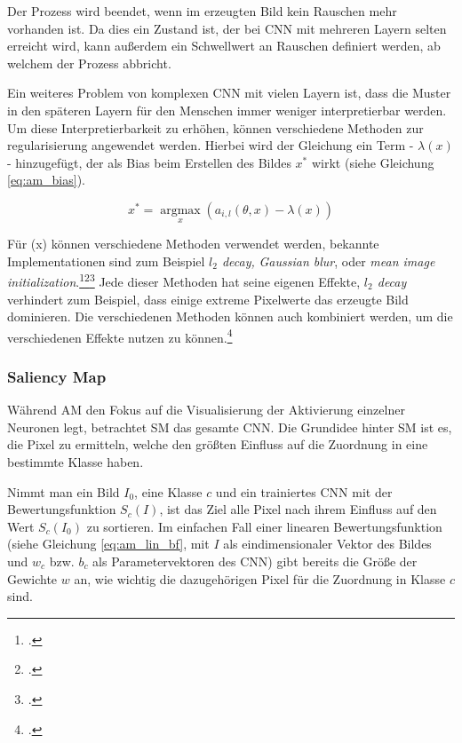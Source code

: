 Der Prozess wird beendet, wenn im erzeugten Bild kein Rauschen mehr vorhanden ist. Da dies ein Zustand ist, der bei \ac{CNN} mit mehreren Layern selten erreicht wird, kann außerdem ein Schwellwert an Rauschen definiert werden, ab welchem der Prozess abbricht.

Ein weiteres Problem von komplexen \ac{CNN} mit vielen Layern ist, dass die Muster in den späteren Layern für den Menschen immer weniger interpretierbar werden. Um diese Interpretierbarkeit zu erhöhen, können verschiedene Methoden zur regularisierung angewendet werden. Hierbei wird der Gleichung ein Term - $\lambda(x)$ -  hinzugefügt, der als Bias beim Erstellen des Bildes $x^*$ wirkt (siehe Gleichung \ref{eq:am_bias}).

\begin{equation} \label{eq:am_bias}
    x^{*}=\underset{x}{\operatorname{argmax}}\left(a_{i, l}(\theta, x)-\lambda(x)\right)
\end{equation}

Für \lambda(x) können verschiedene Methoden verwendet werden, bekannte Implementationen sind zum Beispiel \textit{$l_2$ decay,} \textit{Gaussian blur}, oder \textit{mean image initialization}.\footcite[Vgl.][1-8]{simonyanDeepConvolutionalNetworks2014}\footcite[Vgl.][1-12]{yosinskiUnderstandingNeuralNetworks2015}\footcite[Vgl.][1-7]{weiUnderstandingIntraClassKnowledge2015}
Jede dieser Methoden hat seine eigenen Effekte, \textit{$l_2$ decay} verhindert zum Beispiel, dass einige extreme Pixelwerte das erzeugte Bild dominieren. Die verschiedenen Methoden können auch kombiniert werden, um die verschiedenen Effekte nutzen zu können.\footcite[Vgl.][S. 1-14]{erhanVisualizingDeepNetwork2009}






\subsubsection{Saliency Map} \label{sec:saliency_map}
Während \ac{AM} den Fokus auf die Visualisierung der Aktivierung einzelner Neuronen legt, betrachtet \ac{SM} das gesamte \ac{CNN}. Die Grundidee hinter \ac{SM} ist es, die Pixel zu ermitteln, welche den größten Einfluss auf die Zuordnung in eine bestimmte Klasse haben. 

Nimmt man ein Bild $I_0$, eine Klasse $c$ und ein trainiertes \ac{CNN} mit der Bewertungsfunktion $S_c(I)$, ist das Ziel alle Pixel nach ihrem Einfluss auf den Wert $S_c(I_0)$ zu sortieren. Im einfachen Fall einer linearen Bewertungsfunktion (siehe Gleichung \ref{eq:am_lin_bf}, mit $I$ als eindimensionaler Vektor des Bildes und $w_c$ bzw. $b_c$ als Parametervektoren des \ac{CNN}) gibt bereits die Größe der Gewichte $w$ an, wie wichtig die dazugehörigen Pixel für die Zuordnung in Klasse $c$ sind. 

